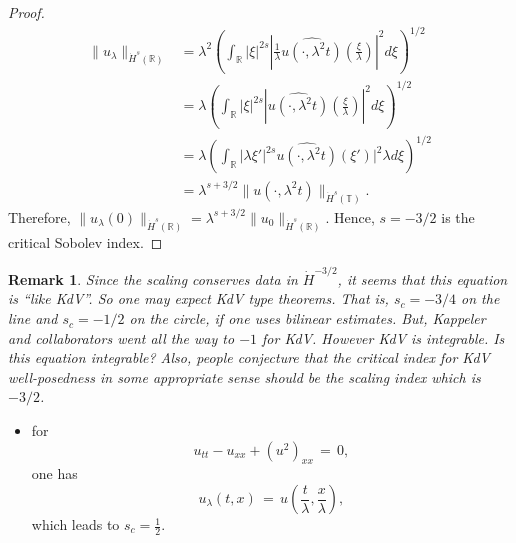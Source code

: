 \documentclass[12pt,reqno]{amsart}
\numberwithin{equation}{section}  %
\newcommand{\rr}{\mathbb{R}}
\newcommand{\ci}{\mathbb{T}}
\newcommand{\wh}{\widehat}
\newtheorem{remark}[theorem]{Remark}
\begin{document}
\begin{proof}
\begin{equation*}
\begin{split}
\| u_{\lambda} \|_{\dot{H}^s(\rr)} 
& = \lambda^{2} \left( \int_{\rr} | \xi |^{2s} |
\frac{1}{\lambda}\wh{u(\cdot, \lambda^{2}t)}(\frac{\xi}{\lambda}) |^2 d \xi
\right)^{1/2}
\\
& = \lambda \left( \int_{\rr}| \xi |^{2s} | \wh{u(\cdot,
\lambda^{2}t)}(\frac{\xi}{\lambda}) |^2 d \xi  \right)^{1/2}
\\
& = \lambda \left( \int_{\rr} | \lambda \xi' |^{2s} 
\wh{u(\cdot, \lambda^{2}t)}(\xi') |^2 \lambda d \xi
\right)^{1/2}
\\
& = \lambda^{s + 3/2} \|u(\cdot, \lambda^{2}t) \|_{\dot{H}^s (\ci)}.
\end{split}
\end{equation*}
Therefore, $\| u_{\lambda}(0) \|_{\dot{H}^s(\rr)} = \lambda^{s + 3/2} \|
u_{0} \|_{\dot{H}^{s}(\rr)}$. Hence, $s=-3/2$ is the critical Sobolev index.
\end{proof}
\begin{framed}
\begin{remark}
Since the scaling conserves data in $\dot{H}^{-3/2}$, it
seems that this equation is ``like KdV''.
So one may expect KdV type theorems.
That is, $s_c=-3/4$ on the line and $s_c=-1/2$ on the circle,
if one uses bilinear estimates.
But, Kappeler and collaborators went all the way to $-1$ for KdV.
However KdV is integrable. Is this equation integrable?
Also, people conjecture that the critical index for KdV well-posedness 
in some appropriate sense should be the scaling index which is  $-3/2$.
\label{rem:kdv-like}
\end{remark}
\end{framed}
\begin{itemize}
\item for 
\[
u_{tt}-u_{xx}+(u^2)_{xx}\,=\,0,
\]
one has 
\[
u_{\lambda}(t,x)\,=\,u\left(\frac{t}{\lambda}, \frac{x}{\lambda}\right),
\]
which leads to $s_c=\frac 12$.
\end{itemize}
\end{document}
